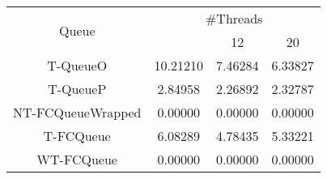 \begin{tabular}{|c|c|c|c|}
\hline
\multirow{2}{*}{Queue} & \multicolumn{3}{c|}{\#Threads}\\\cline{2-4}& \quad 4 & 12 & 20\\
\hline
\hline
T-QueueO & 10.21210 & 7.46284 & 6.33827\\
T-QueueP & 2.84958 & 2.26892 & 2.32787\\
NT-FCQueueWrapped & 0.00000 & 0.00000 & 0.00000\\
T-FCQueue & 6.08289 & 4.78435 & 5.33221\\
WT-FCQueue & 0.00000 & 0.00000 & 0.00000\\
\hline\end{tabular}
